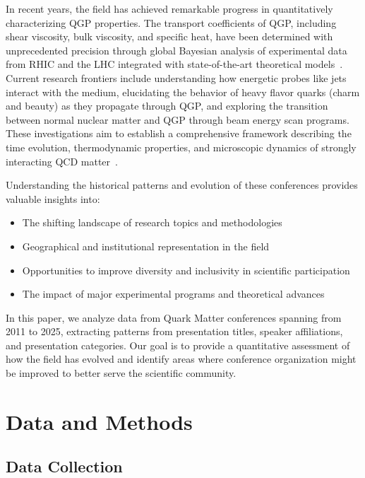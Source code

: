 \documentclass[a4paper,11pt]{article}
\begin{document}
In recent years, the field has achieved remarkable progress in quantitatively characterizing QGP properties. The transport coefficients of QGP, including shear viscosity, bulk viscosity, and specific heat, have been determined with unprecedented precision through global Bayesian analysis of experimental data from RHIC and the LHC integrated with state-of-the-art theoretical models~\cite{Bernhard:2016tnd, JETSCAPE:2020mzn, Nijs:2020roc}. Current research frontiers include understanding how energetic probes like jets interact with the medium, elucidating the behavior of heavy flavor quarks (charm and beauty) as they propagate through QGP, and exploring the transition between normal nuclear matter and QGP through beam energy scan programs. These investigations aim to establish a comprehensive framework describing the time evolution, thermodynamic properties, and microscopic dynamics of strongly interacting QCD matter~\cite{Parkkila:2021tqq, Parkkila:2021yha, Virta:2024avu}.

Understanding the historical patterns and evolution of these conferences provides valuable insights into:
\begin{itemize}
    \item The shifting landscape of research topics and methodologies
    \item Geographical and institutional representation in the field
    \item Opportunities to improve diversity and inclusivity in scientific participation
    \item The impact of major experimental programs and theoretical advances
\end{itemize}

In this paper, we analyze data from Quark Matter conferences spanning from 2011 to 2025, extracting patterns from presentation titles, speaker affiliations, and presentation categories. Our goal is to provide a quantitative assessment of how the field has evolved and identify areas where conference organization might be improved to better serve the scientific community.

\section{Data and Methods}

\subsection{Data Collection}
\end{document}
